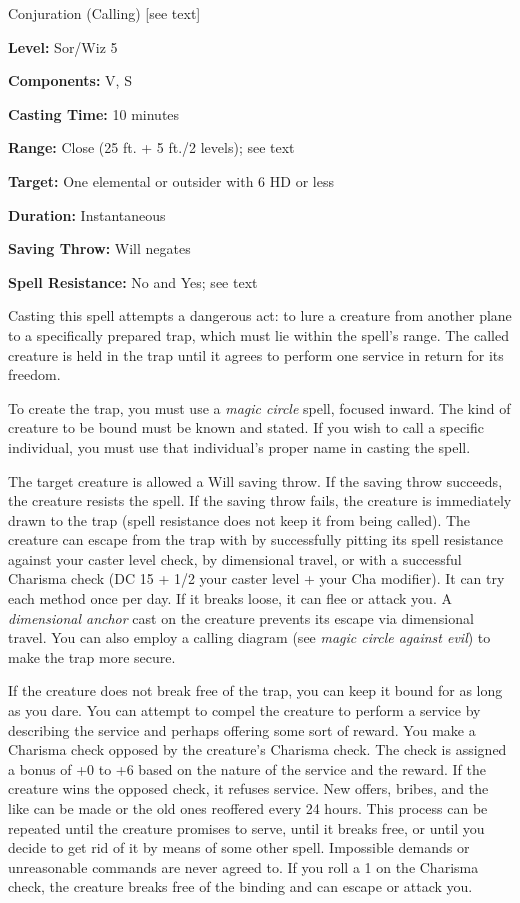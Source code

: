 \label{spell:Lesser Planar Binding}

Conjuration (Calling) [see text]

\textbf{Level:} Sor/Wiz 5

\textbf{Components:} V, S

\textbf{Casting Time:} 10 minutes

\textbf{Range:} Close (25 ft. + 5 ft./2 levels); see text

\textbf{Target:} One elemental or outsider with 6 HD or less

\textbf{Duration:} Instantaneous

\textbf{Saving Throw:} Will negates

\textbf{Spell Resistance:} No and Yes; see text

Casting this spell attempts a dangerous act: to lure a creature from another plane 
to a specifically prepared trap, which must lie within the spell's range. The called 
creature is held in the trap until it agrees to perform one service in return for 
its freedom.

To create the trap, you must use a \textit{magic circle} spell, focused inward. 
The kind of creature to be bound must be known and stated. If you wish to call 
a specific individual, you must use that individual's proper name in casting the 
spell.

The target creature is allowed a Will saving throw. If the saving throw succeeds, 
the creature resists the spell. If the saving throw fails, the creature is immediately 
drawn to the trap (spell resistance does not keep it from being called). The creature 
can escape from the trap with by successfully pitting its spell resistance against 
your caster level check, by dimensional travel, or with a successful Charisma check 
(DC 15 + 1/2 your caster level + your Cha modifier). It can try each method once 
per day. If it breaks loose, it can flee or attack you. A \textit{dimensional anchor 
}cast on the creature prevents its escape via dimensional travel. You can also 
employ a calling diagram (see \textit{magic circle against evil}) to make the trap 
more secure.

If the creature does not break free of the trap, you can keep it bound for as long 
as you dare. You can attempt to compel the creature to perform a service by describing 
the service and perhaps offering some sort of reward. You make a Charisma check 
opposed by the creature's Charisma check. The check is assigned a bonus of +0 to 
+6 based on the nature of the service and the reward. If the creature wins the 
opposed check, it refuses service. New offers, bribes, and the like can be made 
or the old ones reoffered every 24 hours. This process can be repeated until the 
creature promises to serve, until it breaks free, or until you decide to get rid 
of it by means of some other spell. Impossible demands or unreasonable commands 
are never agreed to. If you roll a 1 on the Charisma check, the creature breaks 
free of the binding and can escape or attack you.


